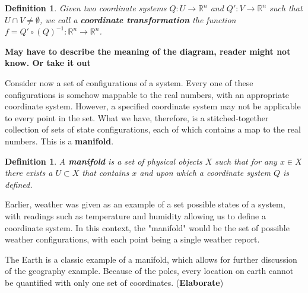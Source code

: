 \documentclass{book}
\newtheorem{defn}[equation]{Definition}
\begin{document}
\begin{defn}
	Given two coordinate systems  $Q : U \to \mathbb{R}^n$ and $Q' : V \to \mathbb{R}^n$ such that $U \cap V \neq \emptyset$, we call a \textbf{coordinate transformation} the function $f = Q' \circ (Q)^{-1} : \mathbb{R}^n \to \mathbb{R}^n$.
\end{defn}



\textbf{May have to describe the meaning of the diagram, reader might not know. Or take it out}

Consider now a set of configurations of a system. Every one of these configurations is somehow mappable to the real numbers, with an appropriate coordinate system. However, a specified coordinate system may not be applicable to every point in the set. What we have, therefore, is a stitched-together collection of sets of state configurations, each of which contains a map to the real numbers. This is a \textbf{manifold}. 

\begin{defn}
	A \textbf{manifold} is a set of physical objects $X$ such that for any $x \in X$ there exists a $U \subset X$ that contains $x$ and upon which a coordinate system $Q$ is defined.
\end{defn}


Earlier, weather was given as an example of a set possible states of a system, with readings such as temperature and humidity allowing us to define a coordinate system. In this context, the "manifold" would be the set of possible weather configurations, with each point being a single weather report. 

The Earth is a classic example of a manifold, which allows for further discussion of the geography example. Because of the poles, every location on earth cannot be quantified with only one set of coordinates. (\textbf{Elaborate})
 
\end{document}
